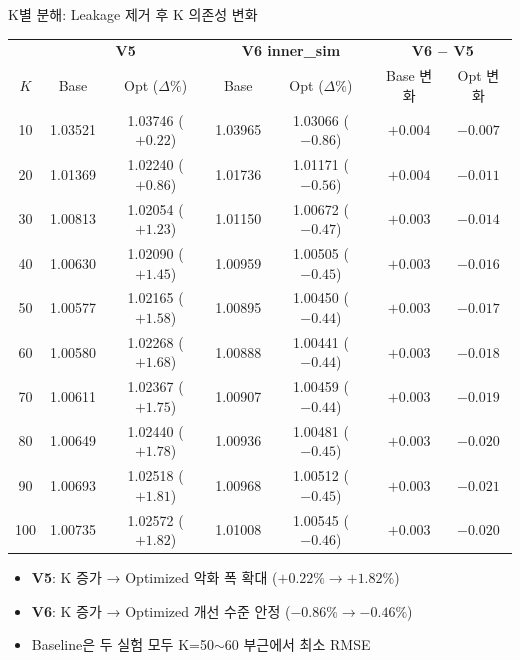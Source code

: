 \documentclass[aspectratio=169,10pt]{beamer}
\begin{document}
\begin{frame}[shrink=5]{K별 분해: Leakage 제거 후 K 의존성 변화}
	\begin{center}
	\renewcommand{\arraystretch}{1.25}
	\begin{tabular}{c|cc|cc|c|c}
		\toprule
		& \multicolumn{2}{c|}{\textbf{V5}} & \multicolumn{2}{c|}{\textbf{V6 inner\_sim}} & \multicolumn{2}{c}{\textbf{V6 $-$ V5}} \\
		$K$ & Base & Opt ($\Delta\%$) & Base & Opt ($\Delta\%$) & Base 변화 & Opt 변화 \\
		\midrule
		10  & 1.03521 & 1.03746 ($+0.22$) & 1.03965 & 1.03066 ($-0.86$) & $+0.004$ & $-0.007$ \\
		20  & 1.01369 & 1.02240 ($+0.86$) & 1.01736 & 1.01171 ($-0.56$) & $+0.004$ & $-0.011$ \\
		30  & 1.00813 & 1.02054 ($+1.23$) & 1.01150 & 1.00672 ($-0.47$) & $+0.003$ & $-0.014$ \\
		40  & 1.00630 & 1.02090 ($+1.45$) & 1.00959 & 1.00505 ($-0.45$) & $+0.003$ & $-0.016$ \\
		50  & 1.00577 & 1.02165 ($+1.58$) & 1.00895 & 1.00450 ($-0.44$) & $+0.003$ & $-0.017$ \\
		60  & 1.00580 & 1.02268 ($+1.68$) & 1.00888 & 1.00441 ($-0.44$) & $+0.003$ & $-0.018$ \\
		70  & 1.00611 & 1.02367 ($+1.75$) & 1.00907 & 1.00459 ($-0.44$) & $+0.003$ & $-0.019$ \\
		80  & 1.00649 & 1.02440 ($+1.78$) & 1.00936 & 1.00481 ($-0.45$) & $+0.003$ & $-0.020$ \\
		90  & 1.00693 & 1.02518 ($+1.81$) & 1.00968 & 1.00512 ($-0.45$) & $+0.003$ & $-0.021$ \\
		100 & 1.00735 & 1.02572 ($+1.82$) & 1.01008 & 1.00545 ($-0.46$) & $+0.003$ & $-0.020$ \\
		\bottomrule
	\end{tabular}
	\end{center}

	\vspace{0.2em}
	\begin{itemize}
		\item \textbf{V5}: K 증가 → Optimized 악화 폭 확대 ($+0.22\% \to +1.82\%$)
		\item \textbf{V6}: K 증가 → Optimized 개선 수준 안정 ($-0.86\% \to -0.46\%$)
		\item Baseline은 두 실험 모두 K=50$\sim$60 부근에서 최소 RMSE
	\end{itemize}
\end{frame}
\end{document}

